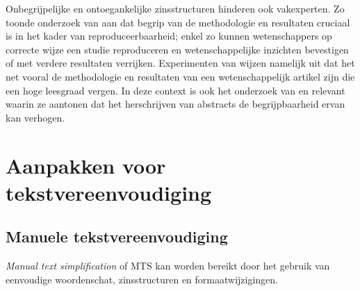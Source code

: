 \medspace

Onbegrijpelijke en ontoegankelijke zinsstructuren hinderen ook vakexperten. Zo toonde onderzoek van \textcite{McNutt2014} aan dat begrip van de methodologie en resultaten cruciaal is in het kader van reproduceerbaarheid; enkel zo kunnen wetenschappers op correcte wijze een studie reproduceren en wetenschappelijke inzichten bevestigen of met verdere resultaten verrijken. Experimenten van \textcite{Hubbard2017} wijzen namelijk uit dat het net vooral de methodologie en resultaten van een wetenschappelijk artikel zijn die een hoge leesgraad vergen. In deze context is ook het onderzoek van \textcite{Hartley1999} en \textcite{Snow2010} relevant waarin ze aantonen dat het herschrijven van abstracts de begrijpbaarheid ervan kan verhogen.



\section{Aanpakken voor tekstvereenvoudiging}

\subsection{Manuele tekstvereenvoudiging}


\textit{Manual text simplification} of MTS kan worden bereikt door het gebruik van eenvoudige woordenschat, zinsstructuren en formaatwijzigingen.

